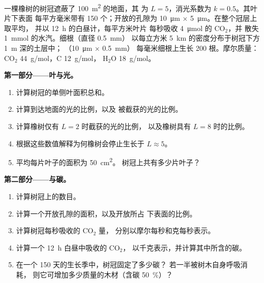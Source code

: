 \begin{problem}
\label{pb:b1:flowering-plant-organization:1}
一棵橡树的树冠遮蔽了 \qty{100}{m^2} 的地面，其
为 $L = 5$，消光系数为 $k = 0.5$。其叶片下表面
每平方毫米带有 \qty{150}{} 个；开放的孔隙为
\qty{10}{\micro m} × \qty{5}{\micro m}。在整个冠层上取平均，
并以 \qty{12}{h} 的白昼计，每平方米叶片
每秒吸收 \qty{4}{\micro mol} 的 $\mathrm{CO_2}$，并
散失 \qty{1}{mmol} 的水汽。细根（直径 \qty{0.5}{mm}）
以每立方米 \qty{5}{km} 的密度分布于树冠下方 \qty{1}{m} 深的土层中；
（\qty{10}{\micro m} × \qty{0.5}{mm}）
每毫米细根上生长 \qty{200}{} 根。摩尔质量：
$\mathrm{CO_2}$ \qty{44}{g/mol}，C \qty{12}{g/mol}，
$\mathrm{H_2O}$ \qty{18}{g/mol}。

\medskip
\noindent\textbf{第一部分——叶与光。}
\begin{enumerate}
  \item 计算树冠的单侧叶面积总和。
  \item 计算到达地面的光的比例，以及
        被截获的光的比例。
  \item 计算橡树仅有 $L = 2$ 时截获的光的比例，
        以及橡树具有 $L = 8$ 时的比例。
  \item 根据这些数值解释为何橡树会停止生长于 $L \approx 5$。
  \item 平均每片叶子的面积为 \qty{50}{cm^2}。
        树冠上共有多少片叶子？
\end{enumerate}

\medskip
\noindent\textbf{第二部分——与碳。}
\begin{enumerate}[resume]
  \item 计算树冠上的数目。
  \item 计算一个开放孔隙的面积，以及开放所占
        下表面的比例。
  \item 计算树冠每秒吸收的 $\mathrm{CO_2}$ 量，
        分别以摩尔每秒和克每秒表示。
  \item 计算一个 \qty{12}{h} 白昼中吸收的 $\mathrm{CO_2}$，
        以千克表示，并计算其中所含的碳。
  \item 在一个 \qty{150}{} 天的生长季中，树冠固定了多少碳？
        若一半被树木自身呼吸消耗，
        则它可增加多少质量的木材（含碳 \qty{50}{\%}）？
\end{enumerate}


\end{problem}
